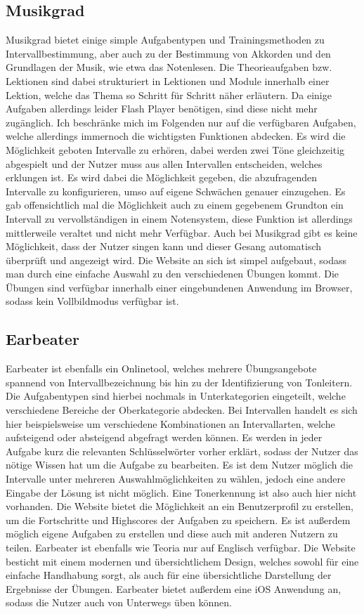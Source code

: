 \subsection*{Musikgrad}
\label{sec:Musikgrad}
Musikgrad bietet einige simple Aufgabentypen und Trainingsmethoden zu Intervallbestimmung, aber auch zu der Bestimmung von Akkorden und den Grundlagen der Musik, wie etwa das Notenlesen. Die Theorieaufgaben bzw. Lektionen sind dabei strukturiert in Lektionen und Module innerhalb einer Lektion, welche das Thema so Schritt für Schritt näher erläutern. Da einige Aufgaben allerdings leider Flash Player benötigen, sind diese nicht mehr
zugänglich. Ich beschränke mich im Folgenden nur auf die verfügbaren Aufgaben, welche allerdings immernoch die wichtigsten Funktionen abdecken. Es wird die Möglichkeit geboten Intervalle zu erhören, dabei werden zwei Töne gleichzeitig abgespielt und der Nutzer muss aus allen Intervallen
entscheiden, welches erklungen ist. Es wird dabei die Möglichkeit gegeben, die abzufragenden Intervalle zu konfigurieren, umso auf eigene Schwächen genauer einzugehen. Es gab offensichtlich mal die Möglichkeit auch zu einem gegebenem Grundton ein Intervall zu vervollständigen in einem Notensystem, diese Funktion
ist allerdings mittlerweile veraltet und nicht mehr Verfügbar. Auch bei Musikgrad gibt es keine Möglichkeit, dass der Nutzer singen kann und dieser Gesang automatisch überprüft und angezeigt wird. Die Website an sich ist simpel aufgebaut, sodass man durch eine einfache Auswahl zu den verschiedenen Übungen kommt. Die Übungen sind
verfügbar innerhalb einer eingebundenen Anwendung im Browser, sodass kein Vollbildmodus verfügbar ist. \cite{musikgrad}


\subsection*{Earbeater}
\label{sec:Earbeater}
Earbeater ist ebenfalls ein Onlinetool, welches mehrere Übungsangebote spannend von Intervallbezeichnung bis hin zu der Identifizierung von Tonleitern. Die Aufgabentypen sind hierbei nochmals in Unterkategorien eingeteilt, welche verschiedene Bereiche der 
Oberkategorie abdecken. Bei Intervallen handelt es sich hier beispielsweise um verschiedene Kombinationen an Intervallarten, welche aufsteigend oder absteigend abgefragt werden können. Es werden in jeder Aufgabe kurz die relevanten Schlüsselwörter vorher erklärt, sodass der Nutzer das nötige Wissen hat um die Aufgabe zu bearbeiten. Es ist dem Nutzer möglich die Intervalle unter mehreren Auswahlmöglichkeiten zu wählen, 
jedoch eine andere Eingabe der Lösung ist nicht möglich. Eine Tonerkennung ist also auch hier nicht vorhanden. Die Website bietet die Möglichkeit an ein Benutzerprofil zu erstellen, um die Fortschritte und Highscores der Aufgaben zu speichern. Es ist außerdem möglich eigene Aufgaben zu erstellen und diese 
auch mit anderen Nutzern zu teilen. Earbeater ist ebenfalls wie Teoria nur auf Englisch verfügbar. Die Website besticht mit einem modernen und übersichtlichem Design, welches sowohl für eine einfache Handhabung sorgt, als auch für eine übersichtliche Darstellung der Ergebnisse der Übungen. Earbeater bietet außerdem 
eine iOS Anwendung an, sodass die Nutzer auch von Unterwegs üben können. \cite{earbeater}


